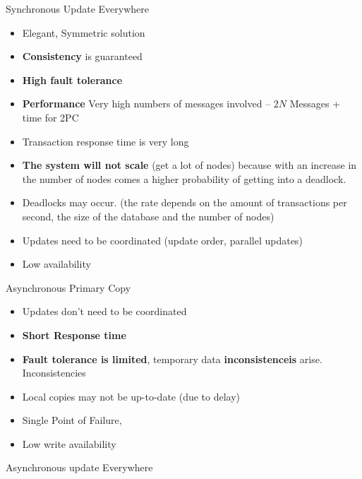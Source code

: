 \documentclass[a4paper,12pt]{article}%
\begin{document}
 
 Synchronous Update Everywhere
 
 {\color[HTML]{9AB299} 
 \begin{itemize}
  \item Elegant, Symmetric solution
  \item {\bf Consistency} is guaranteed
  \item {\bf High fault tolerance}
 \end{itemize}

 }   
{\color[HTML]{A38C8C}
 \begin{itemize}
  \item {\bf Performance} Very high numbers of messages involved -- $2N$ Messages + time for 2PC
  \item Transaction response time is very long
  \item {\bf The system will not scale} (get a lot of nodes) because with an increase in the number of nodes comes a higher probability of getting into a deadlock.
  \item Deadlocks may occur. (the rate depends on the amount of transactions per second, the size of the database and the number of nodes)
  
  \item Updates need to be coordinated (update order, parallel updates)
  \item Low availability
 \end{itemize}
 }
 

 Asynchronous Primary Copy
 
 {\color[HTML]{9AB299} 
 \begin{itemize}
  \item Updates don't need to be coordinated
  \item {\bf Short Response time}
 \end{itemize}

 }   
{\color[HTML]{A38C8C}
 \begin{itemize}
 \item {\bf Fault tolerance is limited}, temporary data {\bf inconsistenceis} arise. Inconsistencies 
 \item Local copies may not be up-to-date (due to delay)
 \item Single Point of Failure,
 \item Low write availability
 \end{itemize}
 }

 
 
 Asynchronous update Everywhere
 
\end{document}
